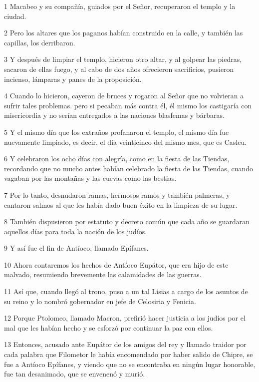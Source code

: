 \par 1 Macabeo y su compañía, guiados por el Señor, recuperaron el templo y la ciudad.
\par 2 Pero los altares que los paganos habían construido en la calle, y también las capillas, los derribaron.
\par 3 Y después de limpiar el templo, hicieron otro altar, y al golpear las piedras, sacaron de ellas fuego, y al cabo de dos años ofrecieron sacrificios, pusieron incienso, lámparas y panes de la proposición.
\par 4 Cuando lo hicieron, cayeron de bruces y rogaron al Señor que no volvieran a sufrir tales problemas. pero si pecaban más contra él, él mismo los castigaría con misericordia y no serían entregados a las naciones blasfemas y bárbaras.
\par 5 Y el mismo día que los extraños profanaron el templo, el mismo día fue nuevamente limpiado, es decir, el día veinticinco del mismo mes, que es Casleu.
\par 6 Y celebraron los ocho días con alegría, como en la fiesta de las Tiendas, recordando que no mucho antes habían celebrado la fiesta de las Tiendas, cuando vagaban por las montañas y las cuevas como las bestias.
\par 7 Por lo tanto, desnudaron ramas, hermosos ramos y también palmeras, y cantaron salmos al que les había dado buen éxito en la limpieza de su lugar.
\par 8 También dispusieron por estatuto y decreto común que cada año se guardaran aquellos días para toda la nación de los judíos.
\par 9 Y así fue el fin de Antíoco, llamado Epífanes.
\par 10 Ahora contaremos los hechos de Antíoco Eupátor, que era hijo de este malvado, resumiendo brevemente las calamidades de las guerras.
\par 11 Así que, cuando llegó al trono, puso a un tal Lisias a cargo de los asuntos de su reino y lo nombró gobernador en jefe de Celosiria y Fenicia.
\par 12 Porque Ptolomeo, llamado Macron, prefirió hacer justicia a los judíos por el mal que les habían hecho y se esforzó por continuar la paz con ellos.
\par 13 Entonces, acusado ante Eupátor de los amigos del rey y llamado traidor por cada palabra que Filometor le había encomendado por haber salido de Chipre, se fue a Antíoco Epífanes, y viendo que no se encontraba en ningún lugar honorable, fue tan desanimado, que se envenenó y murió.
